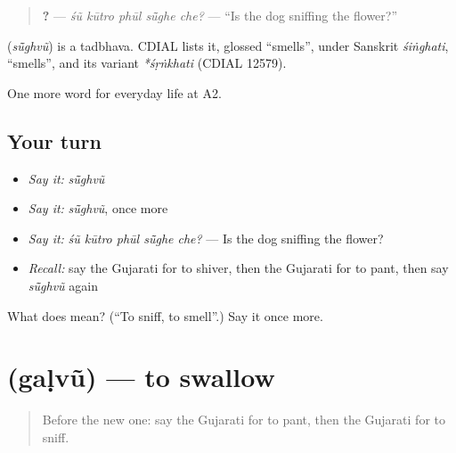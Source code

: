 \begin{quote}
\textbf{    ?} — \emph{śũ kūtro phūl sū̃ghe che?} — \textquotedblleft{}Is the dog sniffing the flower?\textquotedblright{}
\end{quote}

\begin{cousinweb}
\textbf{} (\emph{sū̃ghvũ}) is a tadbhava. CDIAL lists it, glossed \textquotedblleft{}smells\textquotedblright{}, under Sanskrit \emph{śiṅghati}, \textquotedblleft{}smells\textquotedblright{}, and its variant \emph{*śṛṅkhati} (CDIAL 12579).
\end{cousinweb}

\begin{grammarlens}[title={What you've built}]
One more word for everyday life at A2.
\end{grammarlens}

\subsection*{Your turn}
\begin{itemize}
\raggedright
  \item \emph{Say it:} \emph{sū̃ghvũ}
  \item \emph{Say it:} \emph{sū̃ghvũ}, once more
  \item \emph{Say it:} \emph{śũ kūtro phūl sū̃ghe che?} — Is the dog sniffing the flower?
  \item \emph{Recall:} say the Gujarati for to shiver, then the Gujarati for to pant, then say \emph{sū̃ghvũ} again
\end{itemize}

\begin{tcolorbox}[breakable,colback=teal!4,colframe=teal!35!black,title={Before you move on}]
What does  mean? (\textquotedblleft{}To sniff, to smell\textquotedblright{}.) Say it once more.
\end{tcolorbox}
\section[\texorpdfstring{\gu{ગળવું} (gaḷvũ)}{ગળવું (gaḷvũ)}]{ (gaḷvũ) — to swallow}

\label{lesson:GU-C226-galvu}



\begin{quote}
Before the new one: say the Gujarati for to pant, then the Gujarati for to sniff.
\end{quote}

